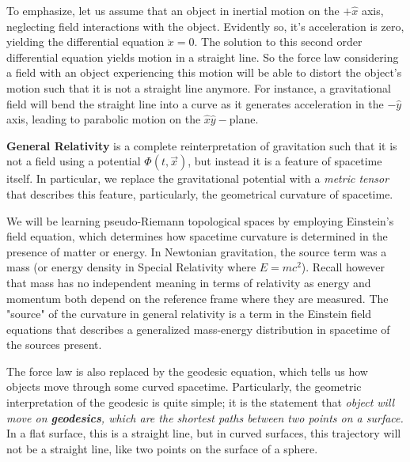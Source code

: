 \documentclass{article}
\begin{document}
 		To emphasize, let us assume that an object in inertial motion on the $+\hat{x}$ axis, neglecting field interactions with the object. Evidently so, it's acceleration is zero, yielding the differential equation $\ddot{x} = 0$. The solution to this second order differential equation yields motion in a straight line. So the force law considering a field with an object experiencing this motion will be able to distort the object's motion such that it is not a straight line anymore. For instance, a gravitational field will bend the straight line into a curve as it generates acceleration in the $-\hat{y}$ axis, leading to parabolic motion on the $\hat{x}\hat{y}-$plane.
 		
 		\begin{defn}
 			\textbf{General Relativity} is a complete reinterpretation of gravitation such that it is not a field using a potential $\Phi (t, \vec{x})$, but instead it is a feature of spacetime itself. In particular, we replace the gravitational potential with a \textit{metric tensor} that describes this feature, particularly, the geometrical curvature of spacetime.
 		\end{defn} 
 		We will be learning pseudo-Riemann topological spaces by employing Einstein's field equation, which determines how spacetime curvature is determined in the presence of matter or energy. In Newtonian gravitation, the source term was a mass (or energy density in Special Relativity where $E = mc^2$). Recall however that mass has no independent meaning in terms of relativity as energy and momentum both depend on the reference frame where they are measured. The "source" of the curvature in general relativity is a term in the Einstein field equations that describes a generalized mass-energy distribution in spacetime of the sources present.
 		
 		The force law is also replaced by the geodesic equation, which tells us how objects move through some curved spacetime. Particularly, the geometric interpretation of the geodesic is quite simple; it is the statement that \textit{object will move on \textbf{geodesics}, which are the shortest paths between two points on a surface.} In a flat surface, this is a straight line, but in curved surfaces, this trajectory will not be a straight line, like two points on the surface of a sphere.
 		
\end{document}

